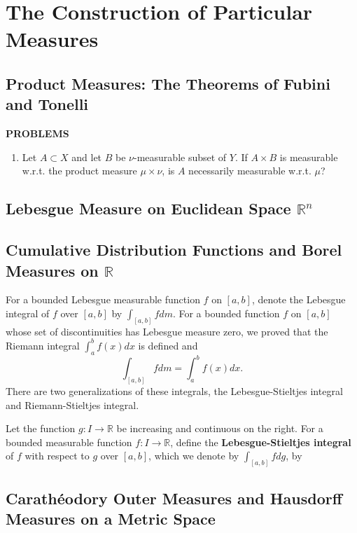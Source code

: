 \chapter{The Construction of Particular Measures}

\section{Product Measures: The Theorems of Fubini and Tonelli}

\begin{center}
	\textbf{PROBLEMS}
\end{center}
\begin{enumerate}
	\setcounter{enumi}{0}
    \item Let $A\subset X$ and let $B$ be $\nu$-measurable subset of $Y$.
    If $A\times B$ is measurable w.r.t. the product measure $\mu\times\nu$, is $A$ necessarily measurable w.r.t. $\mu$?
    
    
\end{enumerate}

\section{Lebesgue Measure on Euclidean Space $\mathbb{R}^n$}

\section{Cumulative Distribution Functions and Borel Measures on $\mathbb{R}$}
For a bounded Lebesgue measurable function $f$ on $[a,b]$, denote the Lebesgue integral of $f$ over $[a,b]$ by $\int_{[a,b]}fdm$.
For a bounded function $f$ on $[a,b]$ whose set of discontinuities has Lebesgue measure zero, we proved that the Riemann integral $\int_a^bf(x)dx$ is defined and 
\[
    \int_{[a,b]}fdm=\int_a^bf(x)dx.
\]
There are two generalizations of these integrals, the Lebesgue-Stieltjes integral and Riemann-Stieltjes integral.

Let the function $g:I\to\mathbb{R}$ be increasing and continuous on the right.
For a bounded measurable function $f:I\to\mathbb{R}$, define the \textbf{Lebesgue-Stieltjes integral} of $f$ with respect to $g$ over $[a,b]$, which we denote by $\int_{[a,b]}fdg$, by

\section{Carath\'eodory Outer Measures and Hausdorff Measures on a Metric Space}
